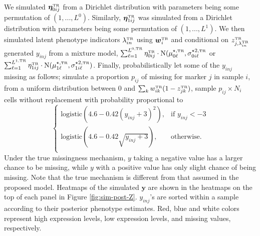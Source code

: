 \documentclass[12pt,]{article}
\newcommand{\p}[1]{\left(#1\right)}
\newcommand{\N}{ \mathcal{N} }
\def\beginmyfig{\begin{figure}[H]\center}
\def\endmyfig{\end{figure}}
\def\bet{\bm{\eta}}
\def\N{\text{N}}
\def\y{\bm{y}}
\newcommand{\true}{{\mbox{\tiny TR}}}
\newcommand{\bw}{\mbox{\boldmath $w$}}
\def\beginmyfig{\begin{figure}[H]\center}
\def\endmyfig{\end{figure}}
\begin{document}
We simulated $\bet_{0ij}^\true$ from a Dirichlet distribution with
parameters being some permutation of $(1,...,L^0)$. Similarly, 
$\bet_{1ij}^\true$ was simulated from a Dirichlet distribution with
parameters being some permutation of $(1,...,L^1)$.
%
We then simulated latent phenotype indicators $\lambda_{in}^\true$ using
$\bw_i^\true$ and conditional on $z^\true_{j,\lambda_{in}^\true}$ generated
$y_{inj}$ from a mixture model, $\sum_{\ell=1}^{L^{0,\true}}
\eta^\true_{0ij}\cdot\N(\mu^{\star, \true}_{0\ell}, \sigma^{\star 2,
\true}_{0i\ell}$ or $\sum_{\ell=1}^{L^{1,\true}}
\eta^\true_{1ij}\cdot\N(\mu^{\star, \true}_{1\ell}, \sigma^{\star 2,
\true}_{1i\ell})$.   Finally, probabilistically let some of the $y_{inj}$
missing as follows; simulate a proportion $p_{ij}$ of missing for marker
$j$ in sample $i$, from a uniform distribution between 0 and  $\sum_k
w^\true_{ik}(1-z^\true_{jk})$, sample $p_{ij}\times N_i$ cells without
replacement with probability proportional to
$$
\begin{cases}
  \text{logistic}\p{4.6 - 0.42(y_{inj}+3)^2}, & \text{if } y_{inj} < -3 \\
  \text{logistic}\p{4.6 - 0.42\sqrt{y_{inj}+3}}, & \text{otherwise.} \\
\end{cases}
$$
%
Under the true missingness mechanism, $y$ taking a negative value has a larger
chance to be missing, while $y$ with a positive value has only slight chance of
being missing.  Note that the true mechanism is different from that assumed in
the proposed model.   
Heatmaps of the simulated $\y$ are shown in the heatmaps on the top of each
panel in Figure \ref{fig:sim-post-Z}. $y_{inj}$'s are sorted within a sample
according to their posterior phenotype estimates.  Red, blue and white colors
represent high expression levels, low expression levels, and missing values,
respectively.

\end{document}
